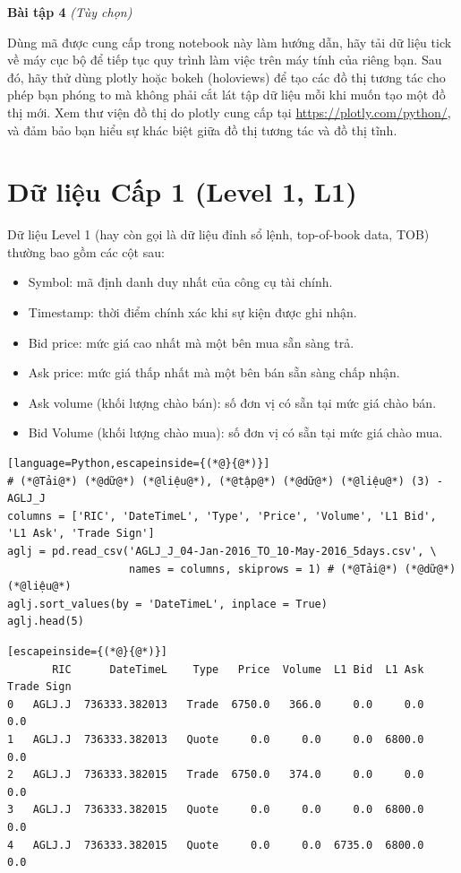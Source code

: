 \textbf{Bài tập 4} \emph{(Tùy chọn)}

Dùng mã được cung cấp trong notebook này làm hướng dẫn, hãy tải dữ liệu tick về máy cục bộ để tiếp tục quy trình làm việc trên máy tính của riêng bạn. Sau đó, hãy thử dùng plotly hoặc bokeh (holoviews) để tạo các đồ thị tương tác cho phép bạn phóng to mà không phải cắt lát tập dữ liệu mỗi khi muốn tạo một đồ thị mới. Xem thư viện đồ thị do plotly cung cấp tại \url{https://plotly.com/python/}, và đảm bảo bạn hiểu sự khác biệt giữa đồ thị tương tác và đồ thị tĩnh.

\section{Dữ liệu Cấp 1 (Level 1, L1)}

Dữ liệu Level 1 (hay còn gọi là dữ liệu đỉnh sổ lệnh, top-of-book data, TOB) thường bao gồm các cột sau:

\begin{itemize}
  \item Symbol: mã định danh duy nhất của công cụ tài chính.
  \item Timestamp: thời điểm chính xác khi sự kiện được ghi nhận.
  \item Bid price: mức giá cao nhất mà một bên mua sẵn sàng trả.
  \item Ask price: mức giá thấp nhất mà một bên bán sẵn sàng chấp nhận.
  \item Ask volume (khối lượng chào bán): số đơn vị có sẵn tại mức giá chào bán.
  \item Bid Volume (khối lượng chào mua): số đơn vị có sẵn tại mức giá chào mua.
\end{itemize}

\begin{lstlisting}[language=Python,escapeinside={(*@}{@*)}]
# (*@Tải@*) (*@dữ@*) (*@liệu@*), (*@tập@*) (*@dữ@*) (*@liệu@*) (3) - AGLJ_J
columns = ['RIC', 'DateTimeL', 'Type', 'Price', 'Volume', 'L1 Bid', 'L1 Ask', 'Trade Sign']
aglj = pd.read_csv('AGLJ_J_04-Jan-2016_TO_10-May-2016_5days.csv', \
                   names = columns, skiprows = 1) # (*@Tải@*) (*@dữ@*) (*@liệu@*)
aglj.sort_values(by = 'DateTimeL', inplace = True)
aglj.head(5)
\end{lstlisting}

\begin{lstlisting}[escapeinside={(*@}{@*)}]
       RIC      DateTimeL    Type   Price  Volume  L1 Bid  L1 Ask  Trade Sign
0   AGLJ.J  736333.382013   Trade  6750.0   366.0     0.0     0.0         0.0
1   AGLJ.J  736333.382013   Quote     0.0     0.0     0.0  6800.0         0.0
2   AGLJ.J  736333.382015   Trade  6750.0   374.0     0.0     0.0         0.0
3   AGLJ.J  736333.382015   Quote     0.0     0.0     0.0  6800.0         0.0
4   AGLJ.J  736333.382015   Quote     0.0     0.0  6735.0  6800.0         0.0
\end{lstlisting}


